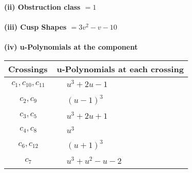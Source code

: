 \documentclass[1p]{elsarticle_modified}
\theoremstyle{definition}
\begin{document}
\flushleft \textbf{(ii) Obstruction class $= 1$}\\~\\
\flushleft \textbf{(iii) Cusp Shapes $= 3 v^2- v-10$}\\~\\
\newpage\renewcommand{\arraystretch}{1}
\flushleft \textbf{(iv) u-Polynomials at the component}\newline \\
\begin{tabular}{m{50pt}|m{274pt}}
Crossings & \hspace{64pt}u-Polynomials at each crossing \\
\hline $$\begin{aligned}c_{1},c_{10},c_{11}\end{aligned}$$&$\begin{aligned}
&u^3+2 u-1
\end{aligned}$\\
\hline $$\begin{aligned}c_{2},c_{9}\end{aligned}$$&$\begin{aligned}
&(u-1)^3
\end{aligned}$\\
\hline $$\begin{aligned}c_{3},c_{5}\end{aligned}$$&$\begin{aligned}
&u^3+2 u+1
\end{aligned}$\\
\hline $$\begin{aligned}c_{4},c_{8}\end{aligned}$$&$\begin{aligned}
&u^3
\end{aligned}$\\
\hline $$\begin{aligned}c_{6},c_{12}\end{aligned}$$&$\begin{aligned}
&(u+1)^3
\end{aligned}$\\
\hline $$\begin{aligned}c_{7}\end{aligned}$$&$\begin{aligned}
&u^3+u^2- u-2
\end{aligned}$\\
\hline
\end{tabular}\\~\\
\newpage\renewcommand{\arraystretch}{1}
\end{document}
